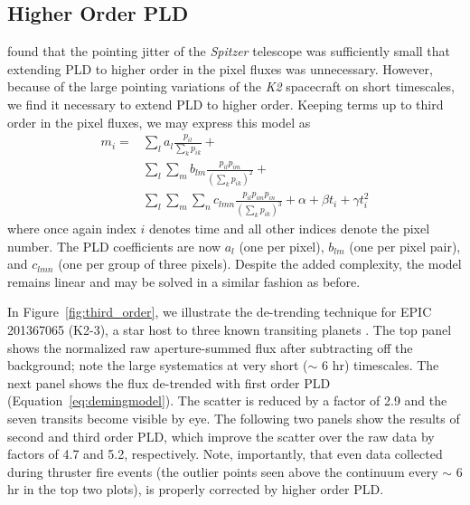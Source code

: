 \documentclass[]{emulateapj}
\begin{document}
\subsection{Higher Order PLD}
\label{sec:higherorder}
\cite{DEM15} found that the pointing jitter of the \emph{Spitzer} telescope was 
sufficiently small that extending PLD to higher order in the pixel fluxes was
unnecessary. However, because of the large pointing variations of the \emph{K2}
spacecraft on short timescales, we find it necessary to extend PLD to higher order.
Keeping terms up to third order in the pixel fluxes, we may express this model as 
\begin{align}
\label{eq:pldmodel}
m_i = &\sum\limits_{l}a_l\frac{p_{il}}{\sum\limits_{k}p_{ik}} + \nonumber\\
      &\sum\limits_{l}\sum\limits_{m}b_{lm}\frac{p_{il}p_{im}}{(\sum\limits_{k}p_{ik})^2} + \nonumber\\
      &\sum\limits_{l}\sum\limits_{m}\sum\limits_{n}c_{lmn}\frac{p_{il}p_{im}p_{in}}{(\sum\limits_{k}p_{ik})^3} + \alpha + \beta t_i + \gamma t_i^2
\end{align}
where once again index $i$ denotes time and all other indices denote the pixel number. 
The PLD coefficients are now $a_l$ (one per pixel), 
$b_{lm}$ (one per pixel pair), and $c_{lmn}$ (one per group of three pixels). Despite
the added complexity, the model remains linear and may be solved in a similar fashion 
as before.

In Figure~\ref{fig:third_order}, we illustrate the de-trending technique for EPIC
201367065 (K2-3), a star host to three known transiting planets \citep{CRO15}. The top
panel shows the normalized raw aperture-summed flux after subtracting off the 
background; note the large systematics at very short ($\sim$ 6 hr) timescales. The
next panel shows the flux de-trended with first order PLD (Equation~\ref{eq:demingmodel}).
The scatter is reduced by a factor of 2.9 and the
seven transits become visible by eye. The following two panels show the results of
second and third order PLD, which improve the scatter over the raw data by factors of 
4.7 and 5.2, respectively. Note, importantly, that even data collected during thruster
fire events (the outlier points seen above the continuum every $\sim$ 6 hr in the top 
two plots), is properly corrected by higher order PLD.
\end{document}
